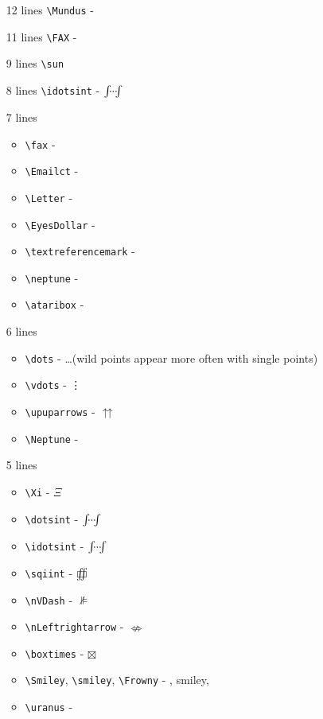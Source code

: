 \begin{multicols}{2}
\begin{itemize}
    \item[12 lines] \verb+\Mundus+ - \Mundus
    \item[11 lines] \verb+\FAX+ - \FAX
    \item[9 lines] \verb+\sun+
    \item[8 lines] \verb+\idotsint+ - $\idotsint$
    \item[7 lines]
    \begin{itemize}
        \item \verb+\fax+ - \fax
        \item \verb+\Emailct+ - \Emailct
        \item \verb+\Letter+ - \Letter
        \item \verb+\EyesDollar+ - \EyesDollar
        \item \verb+\textreferencemark+ - \textreferencemark
        \item \verb+\neptune+ - %
        \item \verb+\ataribox+ - %
    \end{itemize}
    \item[6 lines]
    \begin{itemize}
        \item \verb+\dots+ - \dots (wild points appear more often with single points)
        \item \verb+\vdots+ - \vdots
        \item \verb+\upuparrows+ - $\upuparrows$
        \item \verb+\Neptune+ - \Neptune
    \end{itemize}
    \item[5 lines]
    \begin{itemize}
        \item \verb+\Xi+ - $\Xi$
        \item \verb+\dotsint+ - $\dotsint$
        \item \verb+\idotsint+ - $\idotsint$
        \item \verb+\sqiint+ - $\sqiint$
        \item \verb+\nVDash+ - $\nVDash$
        \item \verb+\nLeftrightarrow+ - $\nLeftrightarrow$
        \item \verb+\boxtimes+ - $\boxtimes$
        \item \verb+\Smiley+, \verb+\smiley+, \verb+\Frowny+ - \Smiley, smiley, \Frowny
        \item \verb+\uranus+ - %

\end{itemize}
\end{itemize}
\end{multicols}
